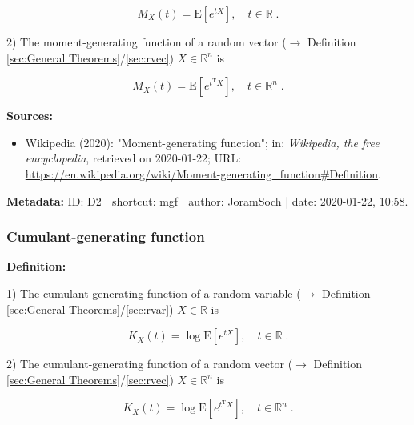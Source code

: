 \documentclass[a4paper,12pt,twoside]{book}
\begin{document}
\begin{equation} \label{eq:mgf-mgf-var}
M_X(t) = \mathrm{E} \left[ e^{tX} \right], \quad t \in \mathbb{R} \; .
\end{equation}

2) The moment-generating function of a random vector ($\rightarrow$ Definition \ref{sec:General Theorems}/\ref{sec:rvec}) $X \in \mathbb{R}^n$ is

\begin{equation} \label{eq:mgf-mgf-vec}
M_X(t) = \mathrm{E} \left[ e^{t^\mathrm{T}X} \right], \quad t \in \mathbb{R}^n \; .
\end{equation}


\vspace{1em}
\textbf{Sources:}
\begin{itemize}
\item Wikipedia (2020): "Moment-generating function"; in: \textit{Wikipedia, the free encyclopedia}, retrieved on 2020-01-22; URL: \url{https://en.wikipedia.org/wiki/Moment-generating_function#Definition}.
\end{itemize}


\vspace{1em}
\textbf{Metadata:} ID: D2 | shortcut: mgf | author: JoramSoch | date: 2020-01-22, 10:58.
\vspace{1em}



\subsubsection[\textit{Cumulant-generating function}]{Cumulant-generating function} \label{sec:cgf}
\setcounter{equation}{0}

\textbf{Definition:}

1) The cumulant-generating function of a random variable ($\rightarrow$ Definition \ref{sec:General Theorems}/\ref{sec:rvar}) $X \in \mathbb{R}$ is

\begin{equation} \label{eq:cgf-cgf-var}
K_X(t) = \log \mathrm{E} \left[ e^{tX} \right], \quad t \in \mathbb{R} \; .
\end{equation}

2) The cumulant-generating function of a random vector ($\rightarrow$ Definition \ref{sec:General Theorems}/\ref{sec:rvec}) $X \in \mathbb{R}^n$ is

\begin{equation} \label{eq:cgf-cgf-vec}
K_X(t) = \log \mathrm{E} \left[ e^{t^\mathrm{T}X} \right], \quad t \in \mathbb{R}^n \; .
\end{equation}
\end{document}
